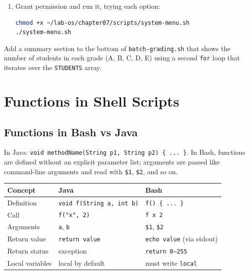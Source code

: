 \begin{enumerate}
\begin{lstlisting}[language=bash, caption={Contents of system-menu.sh}]
    case $CHOICE in
        1) df -h ;;
        2) free -h ;;
        3) ps aux --sort=-%cpu | head -6 ;;
        4) echo "Goodbye!"; exit 0 ;;
        *) echo "Invalid choice." ;;
    esac
done
\end{lstlisting}

  \item Grant permission and run it, trying each option:
\begin{lstlisting}[language=bash, caption={Running the menu}]
chmod +x ~/lab-os/chapter07/scripts/system-menu.sh
./system-menu.sh
\end{lstlisting}
\end{enumerate}

\begin{exercisebox}[Exercise 7.3]
Add a summary section to the bottom of \texttt{batch-grading.sh} that shows
the number of students in each grade (A, B, C, D, E) using a second
\texttt{for} loop that iterates over the \texttt{STUDENTS} array.
\end{exercisebox}

\section{Functions in Shell Scripts}
\label{sec:functions-shell-scripts}

\subsection*{Functions in Bash vs Java}

In Java: \texttt{void methodName(String p1, String p2) \{ ... \}}. In Bash,
functions are defined without an explicit parameter list; arguments are passed
like command-line arguments and read with \texttt{\$1}, \texttt{\$2}, and so
on.

\begin{center}
\begin{tabular}{lll}
\hline
\textbf{Concept} & \textbf{Java} & \textbf{Bash} \\
\hline
Definition & \texttt{void f(String a, int b)} & \texttt{f() \{ ... \}} \\
Call & \texttt{f("x", 2)} & \texttt{f x 2} \\
Arguments & \texttt{a}, \texttt{b} & \texttt{\$1}, \texttt{\$2} \\
Return value & \texttt{return value} & \texttt{echo value} (via stdout) \\
Return status & exception & \texttt{return 0--255} \\
Local variables & local by default & must write \texttt{local} \\
\hline
\end{tabular}
\end{center}

